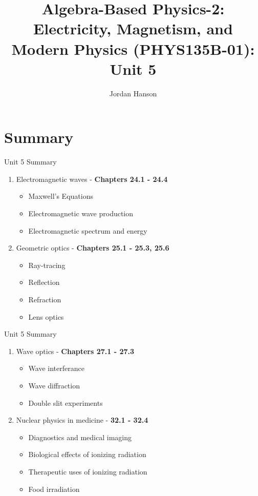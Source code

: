 \documentclass{beamer}
\title{Algebra-Based Physics-2: Electricity, Magnetism, and Modern Physics (PHYS135B-01): Unit 5}
\author{Jordan Hanson}
\institute{Whittier College Department of Physics and Astronomy}
\begin{document}
\maketitle

\section{Summary}

\begin{frame}{Unit 5 Summary}
\begin{enumerate}
\item Electromagnetic waves - \textbf{Chapters 24.1 - 24.4}
\begin{itemize}
\item Maxwell's Equations
\item Electromagnetic wave production
\item Electromagnetic spectrum and energy
\end{itemize}
\item Geometric optics - \textbf{Chapters 25.1 - 25.3, 25.6}
\begin{itemize}
\item Ray-tracing
\item Reflection
\item Refraction
\item Lens optics
\end{itemize}
\end{enumerate}
\end{frame}

\begin{frame}{Unit 5 Summary}
\begin{enumerate}
\item Wave optics - \textbf{Chapters 27.1 - 27.3}
\begin{itemize}
\item Wave interferance
\item Wave diffraction
\item Double slit experiments
\end{itemize}
\item Nuclear physics in medicine - \textbf{32.1 - 32.4}
\begin{itemize}
\item Diagnostics and medical imaging
\item Biological effects of ionizing radiation
\item Therapeutic uses of ionizing radiation
\item Food irradiation
\end{itemize}
\end{enumerate}
\end{frame}
\end{document}
